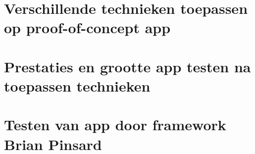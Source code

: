 \section{Verschillende technieken toepassen op proof-of-concept app}
\label{sec:techniekentoepassen}


\section{Prestaties en grootte app testen na toepassen technieken}
\label{sec:prestatiesgrootteapp}

\section{Testen van app door framework Brian Pinsard}
\label{sec:apptesting}